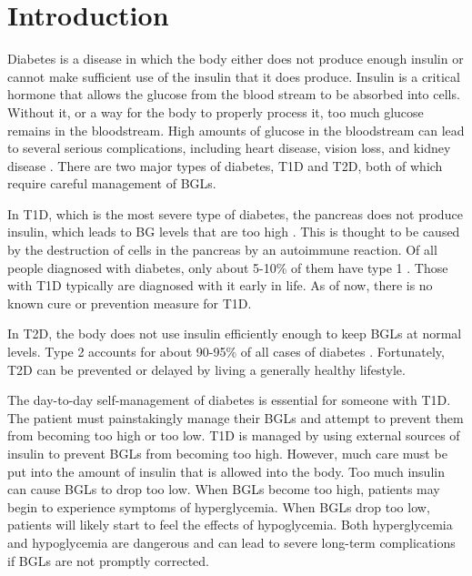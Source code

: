 \chapter{Introduction}
\label{chapter:introduction}

Diabetes is a disease in which the body either does not produce enough insulin or cannot make sufficient use of the insulin that it does produce. Insulin is a critical hormone that allows the glucose from the blood stream to be absorbed into cells. Without it, or a way for the body to properly process it, too much glucose remains in the bloodstream. High amounts of glucose in the bloodstream can lead to several serious complications, including heart disease, vision loss, and kidney disease \cite{CDC:diabetes}. There are two major types of diabetes, \ac{T1D} and \ac{T2D}, both of which require careful management of \ac{BGLs}. %

In \ac{T1D}, which is the most severe type of diabetes, the pancreas does not produce insulin, which leads to BG levels that are too high \cite{CDC:diabetes}. This is thought to be caused by the destruction of cells in the pancreas by an autoimmune reaction. Of all people diagnosed with diabetes, only about 5-10\% of them have type 1 \cite{CDC:diabetes}. Those with \ac{T1D} typically are diagnosed with it early in life. As of now, there is no known cure or prevention measure for \ac{T1D}.

In \ac{T2D}, the body does not use insulin efficiently enough to keep \ac{BGLs} at normal levels. Type 2 accounts for about 90-95\% of all cases of diabetes \cite{CDC:diabetes}. Fortunately, \ac{T2D} can be prevented or delayed by living a generally healthy lifestyle.

The day-to-day self-management of diabetes is essential for someone with \ac{T1D}. The patient must painstakingly manage their \ac{BGLs} and attempt to prevent them from becoming too high or too low. \ac{T1D} is managed by using external sources of insulin to prevent \ac{BGLs} from becoming too high. However, much care must be put into the amount of insulin that is allowed into the body. Too much insulin can cause \ac{BGLs} to drop too low. When \ac{BGLs} become too high, patients may begin to experience symptoms of hyperglycemia. When \ac{BGLs} drop too low, patients will likely start to feel the effects of hypoglycemia. Both hyperglycemia and hypoglycemia are dangerous and can lead to severe long-term complications if \ac{BGLs} are not promptly corrected.

